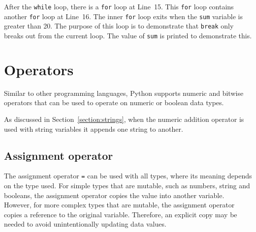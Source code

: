 \documentclass[11pt,a4paper]{article}
\begin{document}
After the \texttt{while} loop, there is a \texttt{for} loop at Line~15.  This \texttt{for} loop contains another \texttt{for} loop at Line~16.  The inner \texttt{for} loop exits when the \texttt{sum} variable is greater than 20.  The purpose of this loop is to demonstrate that \texttt{break} only breaks out from the current loop.  The value of \texttt{sum} is printed to demonstrate this.

\section{Operators}

Similar to other programming languages, Python supports numeric and bitwise operators that can be used to operate on numeric or boolean data types.

As discussed in Section~\ref{section:strings}, when the numeric addition operator is used with string variables it appends one string to another.  

\subsection{Assignment operator}

The assignment operator \texttt{=} can be used with all types, where its meaning depends on the type used.  For simple types that are mutable, such as numbers, string and booleans, the assignment operator copies the value into another variable.  However, for more complex types that are mutable, the assignment operator copies a reference to the original variable.  Therefore, an explicit copy may be needed to avoid unintentionally updating data values.
\end{document}

